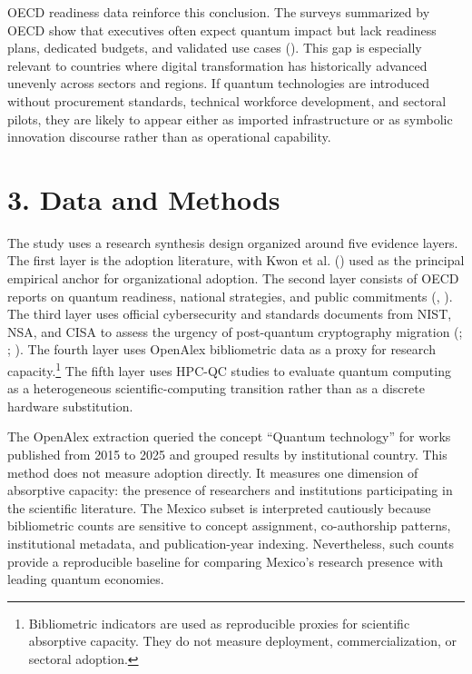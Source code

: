\documentclass[
  11pt,
  letterpaper,
]{article}
\begin{document}
OECD readiness data reinforce this conclusion. The surveys summarized by
OECD show that executives often expect quantum impact but lack readiness
plans, dedicated budgets, and validated use cases
(). This gap is especially relevant to
countries where digital transformation has historically advanced
unevenly across sectors and regions. If quantum technologies are
introduced without procurement standards, technical workforce
development, and sectoral pilots, they are likely to appear either as
imported infrastructure or as symbolic innovation discourse rather than
as operational capability.

\section{3. Data and Methods}\label{data-and-methods}

The study uses a research synthesis design organized around five
evidence layers. The first layer is the adoption literature, with Kwon
et al. () used as the principal empirical
anchor for organizational adoption. The second layer consists of OECD
reports on quantum readiness, national strategies, and public
commitments (,
). The third layer uses official
cybersecurity and standards documents from NIST, NSA, and CISA to assess
the urgency of post-quantum cryptography migration
(;
; ).
The fourth layer uses OpenAlex bibliometric data as a proxy for research
capacity.\footnote{Bibliometric indicators are used as reproducible
  proxies for scientific absorptive capacity. They do not measure
  deployment, commercialization, or sectoral adoption.} The fifth layer
uses HPC-QC studies to evaluate quantum computing as a heterogeneous
scientific-computing transition rather than as a discrete hardware
substitution.

The OpenAlex extraction queried the concept ``Quantum technology'' for
works published from 2015 to 2025 and grouped results by institutional
country. This method does not measure adoption directly. It measures one
dimension of absorptive capacity: the presence of researchers and
institutions participating in the scientific literature. The Mexico
subset is interpreted cautiously because bibliometric counts are
sensitive to concept assignment, co-authorship patterns, institutional
metadata, and publication-year indexing. Nevertheless, such counts
provide a reproducible baseline for comparing Mexico's research presence
with leading quantum economies.
\end{document}
